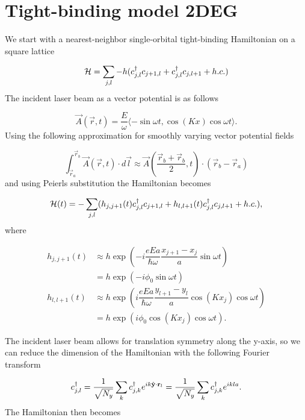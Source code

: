 \section{Tight-binding model 2DEG}\label{app:tbm-2deg}

We start with a nearest-neighbor single-orbital tight-binding Hamiltonian on a square lattice

\begin{equation}
  \mathcal{H} = \sum_{j,l} -h (c^{\dagger}_{j,l} c_{j+1,l} + c^{\dagger}_{j,l} c_{j,l+1} + h.c.)
\end{equation}
The incident laser beam as a vector potential is as follows

\begin{equation}
  \vec{A}(\vec{r}, t) = \dfrac{E}{\omega} \langle -\sin\omega t, \cos(Kx) \cos\omega t \rangle.
\end{equation}
Using the following approximation for smoothly varying vector potential fields

\begin{equation}
  \int_{\vec{r}_a}^{\vec{r}_b} \vec{A}(\vec{r},t) \cdot d\vec{l} \approx \vec{A} \left( \dfrac{\vec{r}_b+\vec{r}_b}{2}, t \right) \cdot (\vec{r}_b - \vec{r}_a)
\end{equation}
and using Peierls substitution the Hamiltonian becomes

\begin{equation}
  \mathcal{H}(t) = -\sum_{j,l} (h_{j,j+1}(t) c^{\dagger}_{j,l} c_{j+1,l} + h_{l,l+1}(t) c^{\dagger}_{j,l} c_{j,l+1} + h.c.),
\end{equation}
where

\begin{align}
  h_{j,j+1}(t) &\approx h \exp\left(-i \dfrac{eEa}{\hbar \omega} \dfrac{x_{j+1}-x_j}{a} \sin \omega t\right) \nonumber \\
  &= h \exp\left(-i \phi_0 \sin \omega t\right) \\
  h_{l,l+1}(t) &\approx h \exp\left(i \dfrac{eEa}{\hbar \omega} \dfrac{y_{l+1}-y_l}{a} \cos(Kx_j)\cos \omega t\right) \nonumber \\
  &= h \exp\left(i \phi_0 \cos(Kx_j)\cos \omega t\right).
\end{align}

The incident laser beam allows for translation symmetry along the y-axis, so we can reduce the dimension of the Hamiltonian with the following Fourier transform

\begin{equation}
  \cc_{j,l} = \dfrac{1}{\sqrt{N_y}} \sum_k \cc_{j,k} e^{ik\hat{y}\cdot \vec{r}_{l}} = \dfrac{1}{\sqrt{N_y}} \sum_k \cc_{j,k} e^{ikla}.
\end{equation}
The Hamiltonian then becomes

